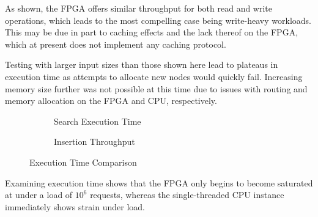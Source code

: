 As shown, the FPGA offers similar throughput for both read and write operations,
which leads to the most compelling case being write-heavy workloads. This may be
due in part to caching effects and the lack thereof on the FPGA, which at
present does not implement any caching protocol.

Testing with larger input sizes than those shown here lead to plateaus in
execution time as attempts to allocate new nodes would quickly fail. Increasing
memory size further was not possible at this time due to issues with routing and
memory allocation on the FPGA and CPU, respectively.


\begin{figure}[H]
	\centering
	\begin{subfigure}{7.5cm}
		\centering
		
		\caption{Search Execution Time}
		\label{fig:search-time-comparison}
	\end{subfigure}
	\begin{subfigure}{7.5cm}
		\centering
		
		\caption{Insertion Throughput}
		\label{fig:insert-time-comparison}
	\end{subfigure}
	\caption{Execution Time Comparison}
	\label{fig:time-comparison}
\end{figure}

Examining execution time shows that the FPGA only begins to become saturated at
under a load of $10^6$ requests, whereas the single-threaded CPU instance
immediately shows strain under load.
